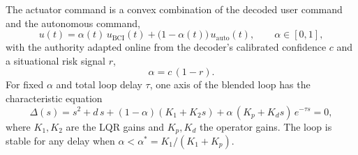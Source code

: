 \documentclass[11pt,a4paper]{article}
\begin{document}
The actuator command is a convex combination of the decoded user command and the
autonomous command,
\begin{equation}
u(t) = \alpha(t)\,u_{\mathrm{BCI}}(t) + \bigl(1-\alpha(t)\bigr)\,u_{\mathrm{auto}}(t),
\qquad \alpha \in [0,1],
\end{equation}
with the authority adapted online from the decoder's calibrated confidence $c$
and a situational risk signal $r$,
\begin{equation}
\alpha = c\,(1-r).
\end{equation}
For fixed $\alpha$ and total loop delay $\tau$, one axis of the blended loop has
the characteristic equation
\begin{equation}
\Delta(s) = s^2 + d\,s + (1-\alpha)(K_1 + K_2 s) + \alpha\,(K_p + K_d s)\,e^{-\tau s} = 0,
\end{equation}
where $K_1, K_2$ are the LQR gains and $K_p, K_d$ the operator gains. The loop
is stable for any delay when $\alpha < \alpha^* = K_1/(K_1 + K_p)$.
\end{document}
